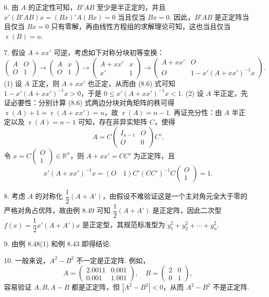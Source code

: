 \documentclass[UTF8, 12pt, fontset=fandol, oneside]{ctexart}
\begin{document}
6. 由 $A$ 的正定性可知，$B'AB$ 至少是半正定的，并且 $x'(B'AB)x=(Bx)'A(Bx)=0$ 当且仅当 $Bx=0$. 因此，$B'AB$ 是正定阵当且仅当 $Bx=0$ 只有零解，再由线性方程组的求解理论可知，这也当且仅当 $\operatorname{r}(B)=n$.

7. 假设 $A+xx'$ 可逆，考虑如下对称分块初等变换：
\begin{equation}
\left(\begin{array}{cc}
A & O\\
O & 1
\end{array}\right)
\to
\left(\begin{array}{cc}
A & x\\
O & 1
\end{array}\right)
\to
\left(\begin{array}{cc}
A+xx' & x\\
x' & 1
\end{array}\right)
\to
\left(\begin{array}{cc}
A+xx' & O\\
O & 1-x'(A+xx')^{-1}x
\end{array}\right).
\tag{8.6}
\end{equation}
(1) 设 $A$ 正定，则 $A+xx'$ 也正定，从而由 (8.6) 式可知 $1-x'(A+xx')^{-1}x>0$，于是 $0\le x'(A+xx')^{-1}x<1$. (2) 设 $A$ 半正定，先证必要性：分别计算 (8.6) 式两边分块对角矩阵的秩可得 $\operatorname{r}(A)+1=\operatorname{r}(A+xx')=n$，故 $\operatorname{r}(A)=n-1$. 再证充分性：由 $A$ 半正定以及 $\operatorname{r}(A)=n-1$ 可知，存在非异实矩阵 $C$，使得
\[
A=C\left(\begin{array}{cc}I_{n-1}&O\\ O&0\end{array}\right)C'.
\]
令 $x=C\left(\begin{array}{c}O\\ 1\end{array}\right)\in\mathbb{R}^n$，则 $A+xx'=CC'$ 为正定阵，且
\[
x'(A+xx')^{-1}x=(O\quad 1)C'(CC')^{-1}C\left(\begin{array}{c}O\\ 1\end{array}\right)=1.
\]

8. 考虑 $A$ 的对称化 $\dfrac12(A+A')$，由假设不难验证这是一个主对角元全大于零的严格对角占优阵，故由例 8.49 可知 $\dfrac12(A+A')$ 是正定阵，因此二次型 $f(x)=\dfrac12x'(A+A')x$ 是正定型，其规范标准型为 $y_1^2+y_2^2+\cdots+y_n^2$.

9. 由例 8.48(1) 和例 8.43 即得结论.

10. 一般来说，$A^2-B^2$ 不一定是正定阵. 例如，
\[
A=\left(\begin{array}{cc}2.0011&0.001\\ 0.001&1.001\end{array}\right),\quad
B=\left(\begin{array}{cc}2&0\\ 0&1\end{array}\right),
\]
容易验证 $A,B,A-B$ 都是正定阵，但 $|A^2-B^2|<0$，从而 $A^2-B^2$ 不是正定阵.
\end{document}
